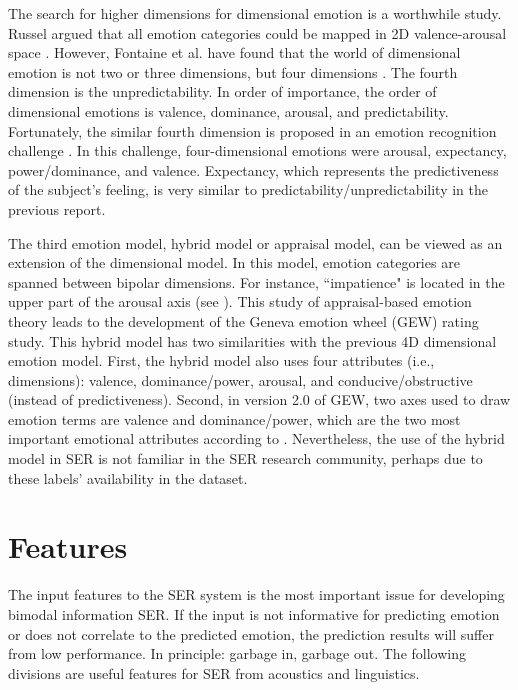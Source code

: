 The search for higher dimensions for dimensional emotion is a worthwhile study.
Russel argued that all emotion categories could be mapped in 2D valence-arousal
space \cite{Russell1980a}. However, Fontaine et al. have found that the world
of dimensional emotion is not two or three dimensions, but four dimensions
\cite{Fontaine2017}. The fourth dimension is the unpredictability. In order of
importance, the order of dimensional emotions is valence, dominance, arousal,
and predictability. Fortunately, the similar fourth dimension is proposed in an
emotion recognition challenge \cite{Schuller2012}. In this challenge,
four-dimensional emotions were arousal, expectancy, power/dominance, and
valence. Expectancy, which represents the predictiveness of the subject's
feeling, is very similar to predictability/unpredictability in the previous
report.

The third emotion model, hybrid model or appraisal model, can be viewed as an
extension of the dimensional model. In this model, emotion categories are
spanned between bipolar dimensions. For instance, ``impatience" is located in
the upper part of the arousal axis (see \cite{Scherer2005}). This study of
appraisal-based emotion theory leads to the development of the Geneva emotion
wheel (GEW) rating study. This hybrid model has two similarities with the
previous 4D dimensional emotion model. First, the hybrid model also uses four
attributes (i.e., dimensions): valence, dominance/power, arousal, and
conducive/obstructive (instead of predictiveness). Second, in version 2.0 of
GEW, two axes used to draw emotion terms are valence and dominance/power, which
are the two most important emotional attributes according to
\cite{Fontaine2017}. Nevertheless, the use of the hybrid model in SER is not
familiar in the SER research community, perhaps due to these labels'
availability in the dataset.

\section{Features}
The input features to the SER system is the most important issue for developing
bimodal information SER. If the input is not informative for predicting emotion
or does not correlate to the predicted emotion, the prediction results will
suffer from low performance. In principle: garbage in, garbage out.  The
following divisions are useful features for SER from acoustics and linguistics.


